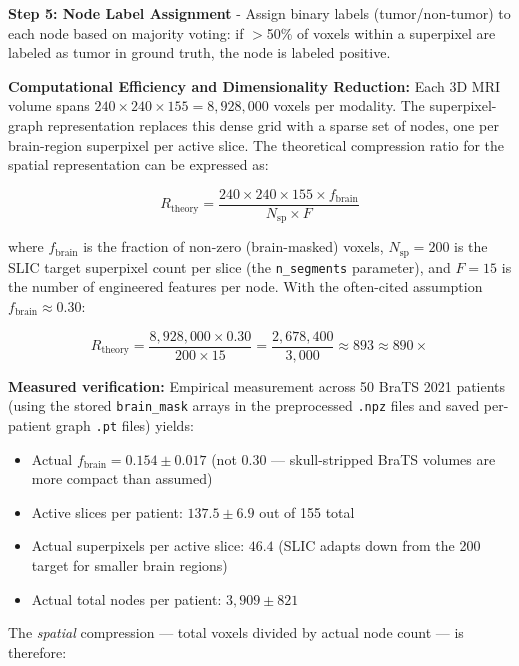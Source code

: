 \documentclass{article}
\begin{document}
\textbf{Step 5: Node Label Assignment} - Assign binary labels (tumor/non-tumor) to each node based on majority voting: if $>$50\% of voxels within a superpixel are labeled as tumor in ground truth, the node is labeled positive.

\textbf{Computational Efficiency and Dimensionality Reduction:} Each 3D MRI volume spans $240 \times 240 \times 155 = 8{,}928{,}000$ voxels per modality. The superpixel-graph representation replaces this dense grid with a sparse set of nodes, one per brain-region superpixel per active slice. The theoretical compression ratio for the spatial representation can be expressed as:

\begin{equation}
R_{\text{theory}} = \frac{240 \times 240 \times 155 \times f_{\text{brain}}}{N_{\text{sp}} \times F}
\label{eq:compression_theory}
\end{equation}

where $f_{\text{brain}}$ is the fraction of non-zero (brain-masked) voxels, $N_{\text{sp}} = 200$ is the SLIC target superpixel count per slice (the \texttt{n\_segments} parameter), and $F = 15$ is the number of engineered features per node. With the often-cited assumption $f_{\text{brain}} \approx 0.30$:

\begin{equation}
R_{\text{theory}} = \frac{8{,}928{,}000 \times 0.30}{200 \times 15} = \frac{2{,}678{,}400}{3{,}000} \approx 893 \approx 890\times
\label{eq:compression_890}
\end{equation}

\textbf{Measured verification:} Empirical measurement across 50 BraTS 2021 patients (using the stored \texttt{brain\_mask} arrays in the preprocessed \texttt{.npz} files and saved per-patient graph \texttt{.pt} files) yields:

\begin{itemize}
\item Actual $f_{\text{brain}} = 0.154 \pm 0.017$ (not 0.30 — skull-stripped BraTS volumes are more compact than assumed)
\item Active slices per patient: $137.5 \pm 6.9$ out of 155 total
\item Actual superpixels per active slice: $46.4$ (SLIC adapts down from the 200 target for smaller brain regions)
\item Actual total nodes per patient: $3{,}909 \pm 821$
\end{itemize}

The \textit{spatial} compression — total voxels divided by actual node count — is therefore:
\end{document}

